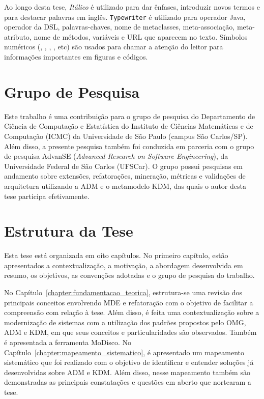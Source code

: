Ao longo desta tese, \textit{Itálico} é utilizado para dar ênfases, introduzir novos termos e para destacar palavras em inglês. \texttt{Typewriter} é utilizado para operador Java, operador da DSL, palavras-chaves, nome de metaclasses, meta-associação, meta-atributo, nome de métodos, variáveis e URL que aparecem no texto. Símbolos numéricos (, , , , etc) são usados para chamar a atenção do leitor para informações importantes em figuras e códigos.

\section{Grupo de Pesquisa}

Este trabalho é uma contribuição para o grupo de pesquisa do Departamento de Ciência de Computação e Estatística do Instituto de Ciências Matemáticas e de Computação (ICMC) da Universidade de São Paulo (campus São Carlos/SP). Além disso, a presente pesquisa também foi conduzida em parceria com o grupo de pesquisa AdvanSE (\textit{Advanced Research on Software Engineering}), da Universidade Federal de São Carlos (UFSCar). O grupo possui pesquisas em andamento sobre extensões, refatorações, mineração, métricas e validações de arquitetura utilizando a ADM e o metamodelo KDM, das quais o autor desta tese participa efetivamente.

\section{Estrutura da Tese}

Esta tese está organizada em oito capítulos. No primeiro capítulo, estão apresentados a contextualização, a motivação, a abordagem desenvolvida em resumo, os objetivos, as convenções adotadas e o grupo de pesquisa do trabalho. 

No Capítulo~\ref{chapter:fundamentacao_teorica}, estrutura-se uma revisão dos principais conceitos envolvendo MDE e refatoração com o objetivo de facilitar a compreensão  com relação à tese. Além disso, é feita uma contextualização sobre a modernização de sistemas com a utilização dos padrões propostos pelo OMG, ADM e KDM, em que seus conceitos e particularidades são observados. Também é apresentada a ferramenta MoDisco. 
%
%
No Capítulo~\ref{chapter:mapeamento_sistematico}, é apresentado um mapeamento sistemático que foi realizado com o objetivo de identificar e entender soluções já desenvolvidas sobre ADM e KDM. Além disso, nesse mapeamento também são demonstradas as principais constatações e questões em aberto que nortearam a tese.

